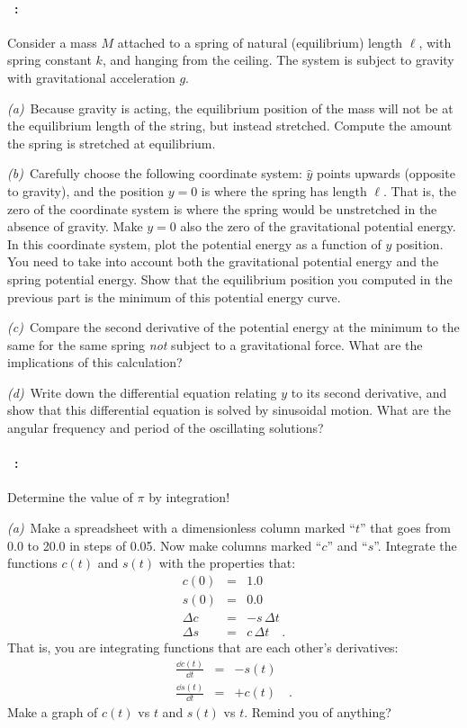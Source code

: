 \documentclass[12pt]{article}
\begin{document}
\paragraph{\problemname~\theproblem:}%
Consider a mass $M$ attached to a spring of natural (equilibrium)
length $\ell$, with spring constant $k$, and hanging from the
ceiling. The system is subject to gravity with gravitational
acceleration $g$.

\textsl{(a)}~Because gravity is acting, the equilibrium position of
the mass will not be at the equilibrium length of the string, but
instead stretched. Compute the amount the spring is stretched at
equilibrium.

\textsl{(b)}~Carefully choose the following coordinate system:
$\hat{y}$ points upwards (opposite to gravity), and the position $y=0$
is where the spring has length $\ell$. That is, the zero of the
coordinate system is where the spring would be unstretched in the
absence of gravity. Make $y=0$ also the zero of the gravitational
potential energy. In this coordinate system, plot the potential energy
as a function of $y$ position. You need to take into account both the
gravitational potential energy and the spring potential energy. Show
that the equilibrium position you computed in the previous part is the
minimum of this potential energy curve.

\textsl{(c)}~Compare the second derivative of the potential energy at
the minimum to the same for the same spring \emph{not} subject to a
gravitational force. What are the implications of this calculation?

\textsl{(d)}~Write down the differential equation relating $y$ to its
second derivative, and show that this differential equation is solved
by sinusoidal motion. What are the angular frequency and period of the
oscillating solutions?

\paragraph{\problemname~\theproblem:}%
Determine the value of $\pi$ by integration!

\textsl{(a)}~Make a spreadsheet with a dimensionless column marked
``$t$'' that goes from 0.0 to 20.0 in steps of 0.05.  Now make columns
marked ``$c$'' and ``$s$''.  Integrate the functions $c(t)$ and
$s(t)$ with the properties that:
\begin{eqnarray}\displaystyle
  c(0) & = & 1.0 \\
  s(0) & = & 0.0 \\
  \Delta c & = & -s\,\Delta t \\
  \Delta s & = & c\,\Delta t
  \quad .
\end{eqnarray}
That is, you are integrating functions that are each other's derivatives:
\begin{eqnarray}\displaystyle
  \frac{\dd c(t)}{\dd t} &=& -s(t) \\
  \frac{\dd s(t)}{\dd t} &=& +c(t)
  \quad .
\end{eqnarray}
Make a graph of $c(t)$ vs $t$ and $s(t)$ vs $t$.  Remind you of anything?
\end{document}
